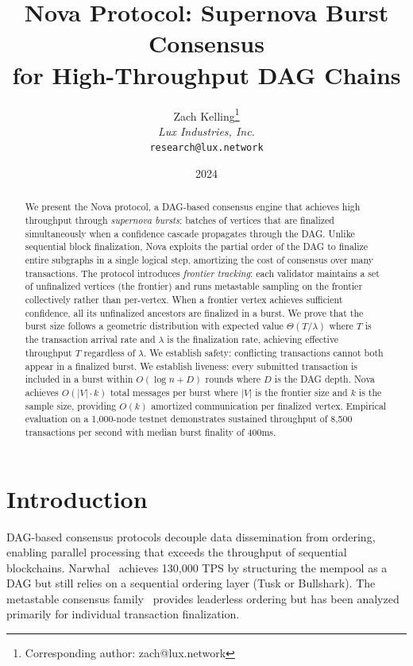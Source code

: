 \documentclass[11pt,a4paper]{article}
\title{\textbf{Nova Protocol: Supernova Burst Consensus\\for High-Throughput DAG Chains}}
\author{
Zach Kelling\thanks{Corresponding author: zach@lux.network}\\
\textit{Lux Industries, Inc.}\\
\texttt{research@lux.network}
}
\date{2024}
\begin{document}
\luxcoverpage

\begin{abstract}
We present the Nova protocol, a DAG-based consensus engine that achieves high throughput
through \emph{supernova bursts}: batches of vertices that are finalized simultaneously
when a confidence cascade propagates through the DAG. Unlike sequential block finalization,
Nova exploits the partial order of the DAG to finalize entire subgraphs in a single
logical step, amortizing the cost of consensus over many transactions.
The protocol introduces \emph{frontier tracking}: each validator maintains a set of
unfinalized vertices (the frontier) and runs metastable sampling on the frontier
collectively rather than per-vertex. When a frontier vertex achieves sufficient confidence,
all its unfinalized ancestors are finalized in a burst.
We prove that the burst size follows a geometric distribution with expected value
$\Theta(T / \lambda)$ where $T$ is the transaction arrival rate and $\lambda$ is the
finalization rate, achieving effective throughput $T$ regardless of $\lambda$.
We establish safety: conflicting transactions cannot both appear in a finalized burst.
We establish liveness: every submitted transaction is included in a burst within
$O(\log n + D)$ rounds where $D$ is the DAG depth.
Nova achieves $O(|V| \cdot k)$ total messages per burst where $|V|$ is the frontier
size and $k$ is the sample size, providing $O(k)$ amortized communication per finalized
vertex. Empirical evaluation on a 1,000-node testnet demonstrates sustained throughput
of 8,500 transactions per second with median burst finality of 400ms.
\end{abstract}

\tableofcontents
\newpage

\section{Introduction}
\label{sec:introduction}

DAG-based consensus protocols decouple data dissemination from ordering, enabling
parallel processing that exceeds the throughput of sequential blockchains.
Narwhal~\cite{danezis2022narwhal} achieves 130,000 TPS by structuring the mempool
as a DAG but still relies on a sequential ordering layer (Tusk or Bullshark).
The metastable consensus family~\cite{rocket2019wave} provides leaderless ordering
but has been analyzed primarily for individual transaction finalization.
\end{document}
